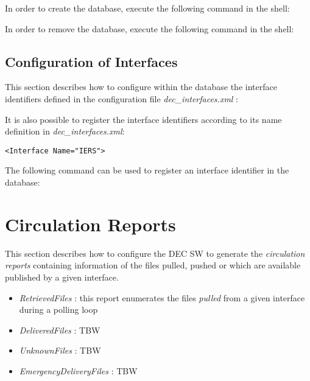 \documentclass[dec_sum_main.tex]{subfiles}
\begin{document}
\noindent
In order to create the database, execute the following command in the shell:

 \newline


\par 

\noindent
In order to remove the database, execute the following command in the shell:



\subsection{Configuration of Interfaces}

This section describes how to configure within the database the interface identifiers defined in the configuration file \textit{dec\_interfaces.xml} :

 \newline

\par

\noindent
It is also possible to register the interface identifiers according to its name definition in \textit{dec\_interfaces.xml}: \begin{verbatim}<Interface Name="IERS">\end{verbatim} 

\par 
\noindent
\noindent
The following command can be used to register an interface identifier in the database:

 \newline


\section{Circulation Reports}
This section describes how to configure the DEC SW to generate the \textit{circulation reports} containing information of the files pulled, pushed or which are available published by a given interface.


\begin{itemize}
	\item \textit{RetrievedFiles} : this report enumerates the files \textit{pulled} from a given interface during a polling loop
	\item \textit{DeliveredFiles} : TBW
	\item \textit{UnknownFiles} : TBW
	\item \textit{EmergencyDeliveryFiles} : TBW
\end{itemize}
\end{document}
